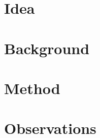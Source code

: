 \documentclass[12pt]{article}
\begin{document}
\title{}
\author{}
\date{}
\maketitle

\section{Idea}

\section{Background}

\section{Method}

\section{Observations}



\end{document}
